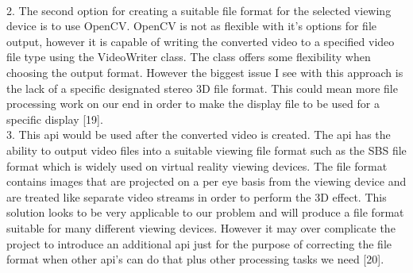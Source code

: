 \documentclass[10pt,draftclsnofoot,onecolumn]{IEEEtran}
\newcommand\tab[1][1cm]{\hspace*{#1}}
\begin{document}
\\
\tab \tab \tab 2. The second option for creating a suitable file format for the selected viewing device is \tab \tab \tab to use OpenCV. OpenCV is not as flexible with it’s options for file output, however it is \newline \tab \tab \tab capable of writing the converted video to a specified video file type using the VideoWriter \tab \tab \tab class. The class offers some flexibility when choosing the output format. However the biggest \tab \tab \tab issue I see with this approach is the lack of a specific designated stereo 3D file format. This \tab \tab \tab could mean more file processing work on our end in order to make the display file to be \tab \tab \tab used for a specific display [19].
 \\
\tab \tab \tab 3.  This api would be used after the converted video is created. The api has the ability to \tab \tab \tab output video files into a suitable viewing file format such as the SBS file format which is widely \tab \tab \tab used on virtual reality viewing devices. The file format contains images that are projected on \tab \tab \tab a per eye basis from the viewing device and are treated like separate video streams in order \tab \tab \tab to perform the 3D effect. This solution looks to be very applicable to our problem and \newline \tab \tab \tab will produce a file format suitable for many different viewing devices. However it may over \tab \tab \tab complicate the project to introduce an additional api just for the purpose of correcting the file \tab \tab \tab format when other api’s can do that plus other processing tasks we need [20].
\end{document}
